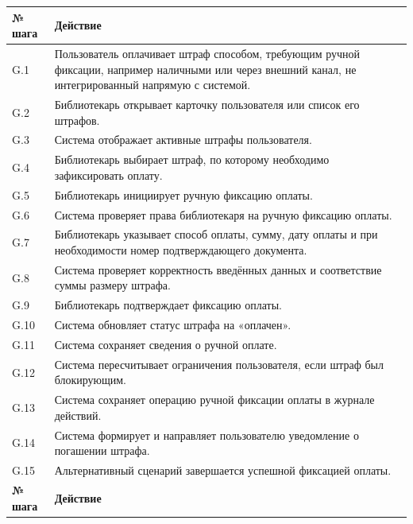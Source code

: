 \documentclass[12pt,a4paper]{article}
\begin{document}
\begin{xltabular}{\textwidth}{
				|>{\raggedright\arraybackslash}p{2.7cm}
				|>{\raggedright\arraybackslash}X|
			}
			
			\textbf{№ шага} & \textbf{Действие} \\
			\hline
			
			G.1 & Пользователь оплачивает штраф способом, требующим ручной фиксации,
			например наличными или через внешний канал, не интегрированный
			напрямую с системой. \\
			\hline
			G.2 & Библиотекарь открывает карточку пользователя или список его штрафов. \\
			\hline
			G.3 & Система отображает активные штрафы пользователя. \\
			\hline
			G.4 & Библиотекарь выбирает штраф, по которому необходимо зафиксировать
			оплату. \\
			\hline
			G.5 & Библиотекарь инициирует ручную фиксацию оплаты. \\
			\hline
			G.6 & Система проверяет права библиотекаря на ручную фиксацию оплаты. \\
			\hline
			G.7 & Библиотекарь указывает способ оплаты, сумму, дату оплаты и при
			необходимости номер подтверждающего документа. \\
			\hline
			G.8 & Система проверяет корректность введённых данных и соответствие
			суммы размеру штрафа. \\
			\hline
			G.9 & Библиотекарь подтверждает фиксацию оплаты. \\
			\hline
			G.10 & Система обновляет статус штрафа на «оплачен». \\
			\hline
			G.11 & Система сохраняет сведения о ручной оплате. \\
			\hline
			G.12 & Система пересчитывает ограничения пользователя, если штраф был
			блокирующим. \\
			\hline
			G.13 & Система сохраняет операцию ручной фиксации оплаты в журнале
			действий. \\
			\hline
			G.14 & Система формирует и направляет пользователю уведомление о
			погашении штрафа. \\
			\hline
			G.15 & Альтернативный сценарий завершается успешной фиксацией оплаты. \\
			\hline
			
			
			\textbf{№ шага} & \textbf{Действие} \\
			\hline
			

\end{xltabular}
\end{document}
